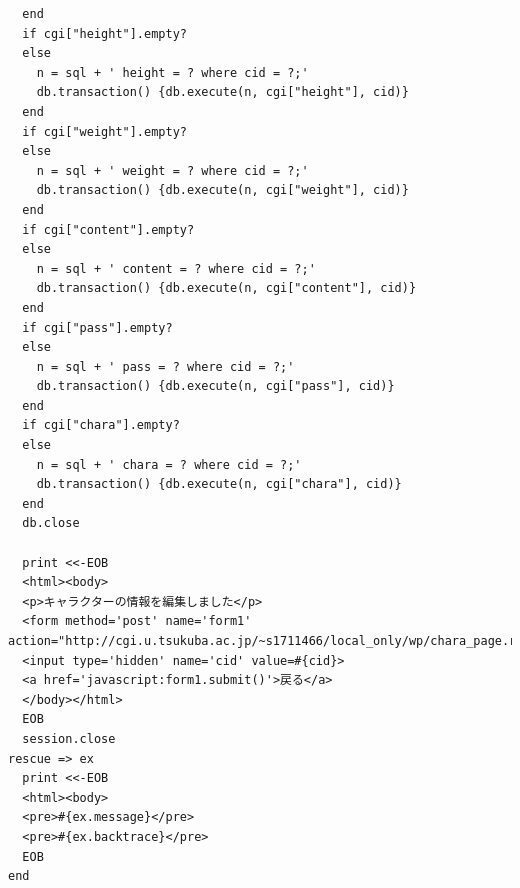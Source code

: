 \documentclass[12pt,a4paper]{jarticle}
\begin{document}
\begin{ttfamily}
\begin{oframed}
\begin{verbatim}
  end
  if cgi["height"].empty?
  else
    n = sql + ' height = ? where cid = ?;'
    db.transaction() {db.execute(n, cgi["height"], cid)}
  end
  if cgi["weight"].empty?
  else
    n = sql + ' weight = ? where cid = ?;'
    db.transaction() {db.execute(n, cgi["weight"], cid)}
  end
  if cgi["content"].empty?
  else
    n = sql + ' content = ? where cid = ?;'
    db.transaction() {db.execute(n, cgi["content"], cid)}
  end
  if cgi["pass"].empty?
  else
    n = sql + ' pass = ? where cid = ?;'
    db.transaction() {db.execute(n, cgi["pass"], cid)}
  end
  if cgi["chara"].empty?
  else
    n = sql + ' chara = ? where cid = ?;'
    db.transaction() {db.execute(n, cgi["chara"], cid)}
  end
  db.close

  print <<-EOB
  <html><body>
  <p>キャラクターの情報を編集しました</p>
  <form method='post' name='form1' action="http://cgi.u.tsukuba.ac.jp/~s1711466/local_only/wp/chara_page.rb">
  <input type='hidden' name='cid' value=#{cid}>
  <a href='javascript:form1.submit()'>戻る</a>
  </body></html>
  EOB
  session.close
rescue => ex
  print <<-EOB
  <html><body>
  <pre>#{ex.message}</pre>
  <pre>#{ex.backtrace}</pre>
  EOB
end
 \end{verbatim}
\end{oframed}

\end{ttfamily}
\end{document}
